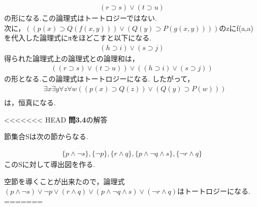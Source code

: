 \documentclass[11pt,dvipdfmx]{jreport}
\begin{document}
\begin{equation*}
  \begin{array}{lll}
    & (r \supset s) \lor (t \supset u) & 
  \end{array}
\end{equation*}
の形になる.この論理式はトートロジーではない.\\
次に，$((p(x) \supset Q(f(x,y))) \lor (Q(y)\supset P(g(x,y))))$のzにf(a,a)を代入した論理式にπをほどこすと以下になる.
\begin{equation*}
  \begin{array}{lll}
    & (h \supset i) \lor (s \supset j) & 
  \end{array}
\end{equation*}
得られた論理式上の論理式との論理和は，
\begin{equation*}
  \begin{array}{lll}
    & ((r \supset s) \lor (t \supset u)) \lor ((h \supset i) \lor (s \supset j)) & 
  \end{array}
\end{equation*}
の形となる.この論理式はトートロジーになる.
したがって，
\begin{equation*}
  \begin{array}{lll}
    & \exists x \exists y \forall z \forall w ((p(x) \supset Q(z)) \lor (Q(y)\supset P(w)))\\
  \end{array}
\end{equation*}
は，恒真になる.

<<<<<<< HEAD
\noindent \textbf{問3.4}の解答 
\par
節集合Sは次の節からなる.\par
\begin{equation*}
  \begin{array}{lll}
      \{p \land \lnot s\},\{ \lnot p\},\{r \land q\},
      \{p \land \lnot q \land s\},\{\lnot r \land q\}
  \end{array}
\end{equation*}
このSに対して導出図を作る.\par
\begin{figure}[!htbp]
\end{figure}
空節を導くことが出来たので，論理式$(p \land \lnot s) \lor \lnot p \lor (r \land q) \lor (p \land \lnot q \land s) \lor (\lnot r \land q)$はトートロジーになる.
=======

\end{document}
